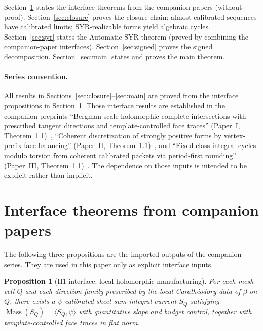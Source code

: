 \documentclass[11pt]{article}
\numberwithin{equation}{section}
\theoremstyle{plain}
\newtheorem{proposition}[theorem]{Proposition}
\theoremstyle{definition}
\theoremstyle{remark}
\DeclareMathOperator{\Mass}{Mass}
\begin{document}
Section~\ref{sec:interface} states the interface theorems from the companion
papers (without proof).
Section~\ref{sec:closure} proves the closure chain: almost-calibrated sequences
have calibrated limits; SYR-realizable forms yield algebraic cycles.
Section~\ref{sec:syr} states the Automatic SYR theorem (proved by
combining the companion-paper interfaces).
Section~\ref{sec:signed} proves the signed decomposition.
Section~\ref{sec:main} states and proves the main theorem.

\paragraph{Series convention.}
All results in Sections~\ref{sec:closure}--\ref{sec:main} are proved from the
interface propositions in Section~\ref{sec:interface}. Those interface results
are established in the companion preprints
``Bergman-scale holomorphic complete intersections with prescribed tangent
directions and template-controlled face traces'' (Paper~I, Theorem~1.1)~\cite{Washburn26I},
``Coherent discretization of strongly positive forms by vertex-prefix face
balancing'' (Paper~II, Theorem~1.1)~\cite{Washburn26II}, and
``Fixed-class integral cycles modulo torsion from coherent calibrated packets via period-first
rounding'' (Paper~III, Theorem~1.1)~\cite{Washburn26III}. The dependence on those inputs is intended to
be explicit rather than implicit.


\section{Interface theorems from companion papers}\label{sec:interface}

The following three propositions are the imported outputs of the companion series.
They are used in this paper only as explicit interface inputs.

\begin{proposition}[H1 interface: local holomorphic manufacturing]
\label{prop:h1-package}
For each mesh cell $Q$ and each direction family prescribed by the local
Carath\'eodory data of $\beta$ on $Q$, there exists a $\psi$-calibrated
sheet-sum integral current $S_Q$ satisfying $\Mass(S_Q)=\langle S_Q,\psi\rangle$
with quantitative slope and budget control, together with template-controlled
face traces in flat norm.
\end{proposition}
\end{document}
